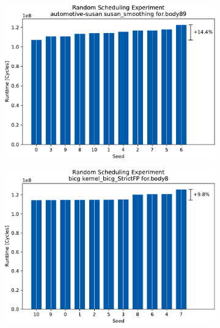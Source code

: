 \begin{figure}
    \vspace{0.5cm}
    \begin{subfigure}{0.0325\textwidth}\caption{}\label{fig:eval:rndm:aurora:c}\end{subfigure}
    \begin{subfigure}{0.44\textwidth}
        \includegraphics[width=\textwidth]{img/random-scheduling-experiment-aurora-collected/automotive-susan-crop.pdf}
    \end{subfigure}
    \hfill
    \begin{subfigure}{0.0325\textwidth}\caption{}\label{fig:eval:rndm:aurora:d}\end{subfigure}
    \begin{subfigure}{0.44\textwidth}
        \includegraphics[width=\textwidth]{img/random-scheduling-experiment-aurora-collected/bicg-crop.pdf}
    \end{subfigure}


\end{figure}

